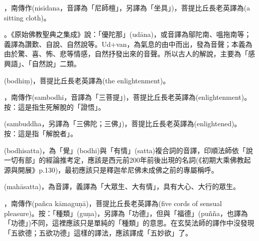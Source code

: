 \startitemgroup[noteitems]
\item{}，南傳作(nisīdana，音譯為「尼師檀」，另譯為「坐具」)，菩提比丘長老英譯為(a sitting cloth)。
\stopitemgroup

\startitemgroup[noteitems]
\item{}。《原始佛教聖典之集成》說：「優陀那」(udāna)，或音譯為鄔陀南、嗢拖南等；義譯為讚歎、自說、自然說等。Ud+van，為氣息的由中而出，發為音聲；本義為由於驚、喜、怖、悲等情感，自然抒發出來的音聲。所以古人的解說，主要為「感興語」、「自然說」二類。
\stopitemgroup

\startitemgroup[noteitems]
\item{}(bodhiṃ)，菩提比丘長老英譯為(the enlightenment)。
\item{}，南傳作(sambodhi，音譯為「三菩提」)，菩提比丘長老英譯為(enlightenment)。按：這是指生死解脫的「證悟」。
\item{}(sambuddha，另譯為「三佛陀；三佛」)，菩提比丘長老英譯為(enlightened)。按：這是指「解脫者」。
\stopitemgroup

\startitemgroup[noteitems]
\item{}(bodhisatta)，為「覺」(bodhi)與「有情」(satta)複合詞的音譯，印順法師依「說一切有部」的經論推考定，應該是西元前200年前後出現的名詞(《初期大乘佛教起源與開展》p.130)，最初應該只是釋迦牟尼佛未成佛之前的專屬稱呼。
\item{}(mahāsatta)，為音譯，義譯為「大眾生、大有情」，具有大心、大行的眾生。
\stopitemgroup

\startitemgroup[noteitems]
\item{}，南傳作(pañca kāmaguṇā)，菩提比丘長老英譯為(five cords of sensual pleasure)。按：「種類」(guṇa)，另譯為「功德」，但與「福德」(puñña，也譯為「功德」)不同，這裡應該只是單純的「種類」的意思。在玄奘法師的譯作中沒發現「五欲德；五欲功德」這樣的譯法，應該譯成「五妙欲」了。
\stopitemgroup

